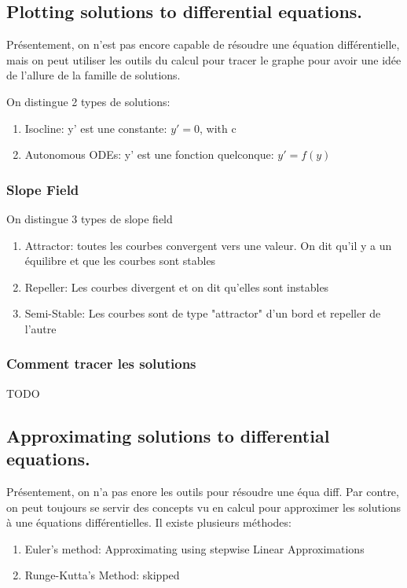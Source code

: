 \documentclass{article}
\begin{document}
\subsection{Plotting solutions to differential equations. }

Présentement, on n'est pas encore capable de résoudre une équation
différentielle, mais on peut utiliser les outils du calcul pour tracer
le graphe pour avoir une idée de l'allure de la famille de solutions.

On distingue 2 types de solutions:
\begin{enumerate}
    \item Isocline: y' est une constante: $ y' = 0$, with c
    \item Autonomous ODEs: y' est une fonction quelconque: $ y' = f(y)$
\end{enumerate}

\subsubsection{Slope Field}%
\label{ssub:Slope Field}

On distingue 3 types de slope field
\begin{enumerate}
    \item Attractor: toutes les courbes convergent vers une valeur. On
	dit qu'il y a un équilibre et que les courbes sont stables
    \item Repeller: Les courbes divergent et on dit qu'elles sont
	instables
    \item Semi-Stable: Les courbes sont de type "attractor" d'un bord
	et repeller de l'autre
\end{enumerate}

\subsubsection{Comment tracer les solutions}

TODO

\subsection{Approximating solutions to differential equations. }

Présentement, on n'a pas enore les outils pour résoudre une équa diff.
Par contre, on peut toujours se servir des concepts vu en calcul pour
approximer les solutions à une équations différentielles. Il existe
plusieurs méthodes:
\begin{enumerate}
    \item Euler's method: Approximating using stepwise Linear Approximations
    \item Runge-Kutta's Method: skipped
\end{enumerate}
\end{document}
